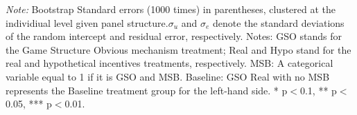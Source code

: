\documentclass[12pt]{article}
\begin{document}
\begin{table}[H]
\begin{tablenotes}
            \footnotesize
            \item \textit{Note:} Bootstrap Standard errors (1000 times) in parentheses, clustered at the individiual level given panel structure.$\sigma_u$ and $\sigma_e$ denote the standard deviations of the random intercept and residual error, respectively. Notes: GSO stands for the Game Structure Obvious mechanism treatment; Real and Hypo stand for the real and hypothetical incentives treatments, respectively. MSB: A categorical variable equal to 1 if it is GSO and MSB. Baseline: GSO Real with no MSB represents the Baseline treatment group for the left-hand side. * p$<$0.1, ** p$<$0.05, *** p$<$0.01.
        \end{tablenotes}
\end{table}





\clearpage
\end{document}
